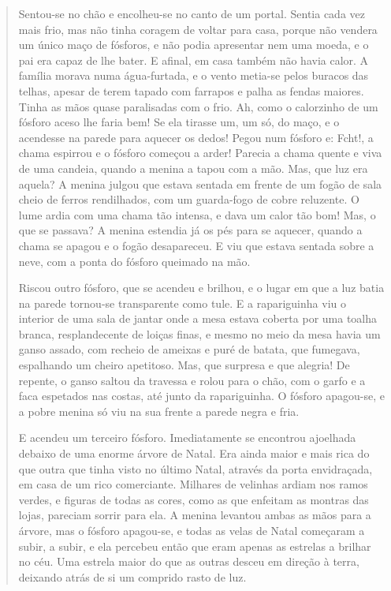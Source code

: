 \begin{itemize}
\begin{itemize}
\begin{quote}
Sentou-se no chão e encolheu-se no canto de um portal. Sentia cada vez
mais frio, mas não tinha coragem de voltar para casa, porque não vendera
um único maço de fósforos, e não podia apresentar nem uma moeda, e o pai
era capaz de lhe bater. E afinal, em casa também não havia calor. A
família morava numa água-furtada, e o vento metia-se pelos buracos das
telhas, apesar de terem tapado com farrapos e palha as fendas maiores.
Tinha as mãos quase paralisadas com o frio. Ah, como o calorzinho de um
fósforo aceso lhe faria bem! Se ela tirasse um, um só, do maço, e o
acendesse na parede para aquecer os dedos! Pegou num fósforo e: Fcht!, a
chama espirrou e o fósforo começou a arder! Parecia a chama quente e
viva de uma candeia, quando a menina a tapou com a mão. Mas, que luz era
aquela? A menina julgou que estava sentada em frente de um fogão de sala
cheio de ferros rendilhados, com um guarda-fogo de cobre reluzente. O
lume ardia com uma chama tão intensa, e dava um calor tão bom! Mas, o
que se passava? A menina estendia já os pés para se aquecer, quando a
chama se apagou e o fogão desapareceu. E viu que estava sentada sobre a
neve, com a ponta do fósforo queimado na mão.

Riscou outro fósforo, que se acendeu e brilhou, e o lugar em que a luz
batia na parede tornou-se transparente como tule. E a rapariguinha viu o
interior de uma sala de jantar onde a mesa estava coberta por uma toalha
branca, resplandecente de loiças finas, e mesmo no meio da mesa havia um
ganso assado, com recheio de ameixas e puré de batata, que fumegava,
espalhando um cheiro apetitoso. Mas, que surpresa e que alegria! De
repente, o ganso saltou da travessa e rolou para o chão, com o garfo e a
faca espetados nas costas, até junto da rapariguinha. O fósforo
apagou-se, e a pobre menina só viu na sua frente a parede negra e fria.

E acendeu um terceiro fósforo. Imediatamente se encontrou ajoelhada
debaixo de uma enorme árvore de Natal. Era ainda maior e mais rica do
que outra que tinha visto no último Natal, através da porta envidraçada,
em casa de um rico comerciante. Milhares de velinhas ardiam nos ramos
verdes, e figuras de todas as cores, como as que enfeitam as montras das
lojas, pareciam sorrir para ela. A menina levantou ambas as mãos para a
árvore, mas o fósforo apagou-se, e todas as velas de Natal começaram a
subir, a subir, e ela percebeu então que eram apenas as estrelas a
brilhar no céu. Uma estrela maior do que as outras desceu em direção à
terra, deixando atrás de si um comprido rasto de luz.


\end{quote}
\end{itemize}
\end{itemize}
